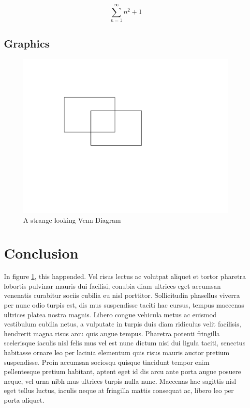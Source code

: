 \documentclass[11pt]{article}
\begin{document}
\begin{displaymath}
	\sum_{n=1}^{\infty}n^2 + 1
\end{displaymath}


\subsection{Graphics}

\begin{figure}[!htbp]
	\begin{center}
		\includegraphics[scale = 0.5]{shapes.pdf}
	\end{center}
	\caption{A strange looking Venn Diagram}
	\label{strange_venn}
\end{figure}


\section{Conclusion}

In figure \ref{strange_venn}, this happended. Vel risus lectus ac volutpat aliquet et tortor pharetra lobortis pulvinar mauris dui facilisi, conubia diam ultrices eget accumsan venenatis curabitur sociis cubilia eu nisl porttitor. Sollicitudin phasellus viverra per nunc odio turpis est, dis mus suspendisse taciti hac cursus, tempus maecenas ultrices platea nostra magnis. Libero congue vehicula metus ac euismod vestibulum cubilia netus, a vulputate in turpis duis diam ridiculus velit facilisis, hendrerit magna risus arcu quis augue tempus. Pharetra potenti fringilla scelerisque iaculis nisl felis mus vel est nunc dictum nisi dui ligula taciti, senectus habitasse ornare leo per lacinia elementum quis risus mauris auctor pretium suspendisse. Proin accumsan sociosqu quisque tincidunt tempor enim pellentesque pretium habitant, aptent eget id dis arcu ante porta augue posuere neque, vel urna nibh mus ultrices turpis nulla nunc. Maecenas hac sagittis nisl eget tellus luctus, iaculis neque at fringilla mattis consequat ac, libero leo per porta aliquet.
\end{document}
